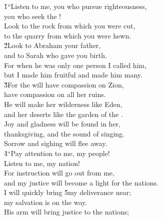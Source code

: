 \begin{poetry}
\poeml {}
\v{1}``Listen to me, you who pursue righteousness, \\
\poemll    you who seek the ! \\
\poeml Look to the rock from which you were cut, \\
\poemll    to the quarry from which you were hewn. \\
\poeml \v{2}Look to Abraham your father, \\
\poemll    and to Sarah who gave you birth. \\
\poeml For when he was only one person I called him, \\
\poemll    but I made him fruitful and made him many. \\
\poeml \v{3}For the  will have compassion on Zion, \\
\poemll    have compassion on all her ruins. \\
\poeml He will make her wilderness like Eden, \\
\poemll    and her deserts like the garden of the . \\
\poeml Joy and gladness will be found in her, \\
\poemll    thanksgiving, and the sound of singing. \\
\poemlll       Sorrow and sighing will flee away. \\
\poeml \v{4}``Pay attention to me, my people! \\
\poemll    Listen to me, my nation! \\
\poeml For instruction will go out from me, \\
\poemll    and my justice will become a light for the nations. \\
\poeml I will quickly bring \v{5}my deliverance near; \\
\poemll    my salvation is on the way. \\
\poeml His arm will bring justice to the nations; \\

\end{poetry}
